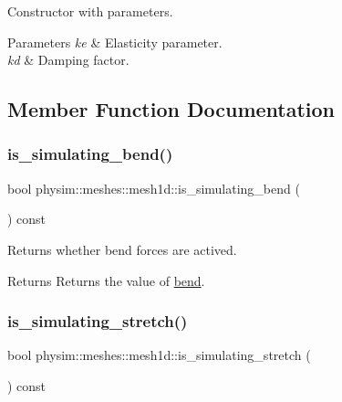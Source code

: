 Constructor with parameters. 


\begin{DoxyParams}{Parameters}
{\em ke} & Elasticity parameter. \\
\hline
{\em kd} & Damping factor. \\
\hline
\end{DoxyParams}


\subsection{Member Function Documentation}
\mbox{\label{classphysim_1_1meshes_1_1mesh1d_a9cd71d3d05385e30b5e7e330e5f5fb0e}} 
\subsubsection{\texorpdfstring{is\+\_\+simulating\+\_\+bend()}{is\_simulating\_bend()}}
{\footnotesize\ttfamily bool physim\+::meshes\+::mesh1d\+::is\+\_\+simulating\+\_\+bend (\begin{DoxyParamCaption}{ }\end{DoxyParamCaption}) const}



Returns whether bend forces are actived. 

\begin{DoxyReturn}{Returns}
Returns the value of \hyperlink{classphysim_1_1meshes_1_1mesh1d_a93d3f9fb656f309bf884333bafa9383e}{bend}. 
\end{DoxyReturn}
\mbox{\label{classphysim_1_1meshes_1_1mesh1d_acf2d9d0399ecbb4bdf3b521d94342258}} 
\subsubsection{\texorpdfstring{is\+\_\+simulating\+\_\+stretch()}{is\_simulating\_stretch()}}
{\footnotesize\ttfamily bool physim\+::meshes\+::mesh1d\+::is\+\_\+simulating\+\_\+stretch (\begin{DoxyParamCaption}{ }\end{DoxyParamCaption}) const}



